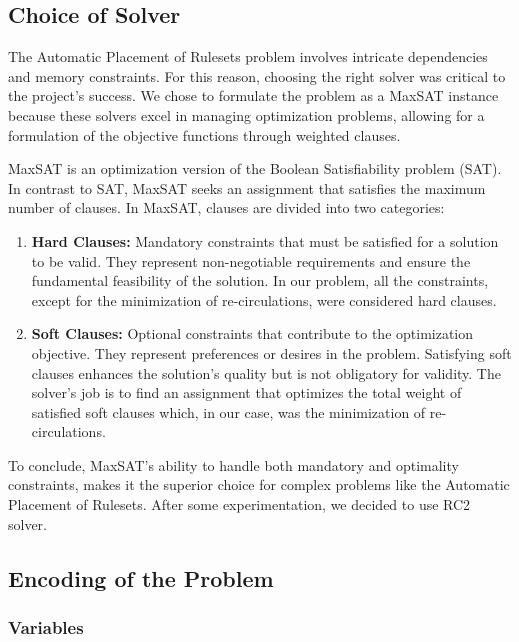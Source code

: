 \subsection{Choice of Solver}

The Automatic Placement of Rulesets problem involves intricate dependencies and memory constraints. For this reason, choosing the right solver was critical to the project's success. We chose to formulate the problem as a MaxSAT instance because these solvers excel in managing optimization problems, allowing for a formulation of the objective functions through weighted clauses.

MaxSAT is an optimization version of the Boolean Satisfiability problem (SAT). In contrast to SAT, MaxSAT seeks an assignment that satisfies the maximum number of clauses. In MaxSAT, clauses are divided into two categories:

\begin{enumerate}
    \item \textbf{Hard Clauses:} Mandatory constraints that must be satisfied for a solution to be valid. They represent non-negotiable requirements and ensure the fundamental feasibility of the solution. In our problem, all the constraints, except for the minimization of re-circulations, were considered hard clauses.

    \item \textbf{Soft Clauses:} Optional constraints that contribute to the optimization objective. They represent preferences or desires in the problem. Satisfying soft clauses enhances the solution's quality but is not obligatory for validity. The solver's job is to find an assignment that optimizes the total weight of satisfied soft clauses which, in our case, was the minimization of re-circulations.
\end{enumerate}

To conclude, MaxSAT's ability to handle both mandatory and optimality constraints, makes it the superior choice for complex problems like the Automatic Placement of Rulesets. After some experimentation, we decided to use RC2 solver.

\subsection{Encoding of the Problem}

\subsubsection{Variables}

